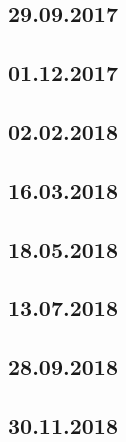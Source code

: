 \documentclass[a4paper,12p]{article}
\begin{document}
	\newpage
	\subsection{29.09.2017}
	
	
	
	
	
	\newpage
	\subsection{01.12.2017}
	
	
	
	
	
	\subsection{02.02.2018}
	
	
	
	
	
	\newpage
	\subsection{16.03.2018}
	
	
	
	
	
	\newpage
	\subsection{18.05.2018}
	
	
	
	
	
	\subsection{13.07.2018}
	
	
	
	
	
	\newpage
	\subsection{28.09.2018}
	
	
	
	
	
	
	\subsection{30.11.2018}
	
	
	
	
	
\end{document}
